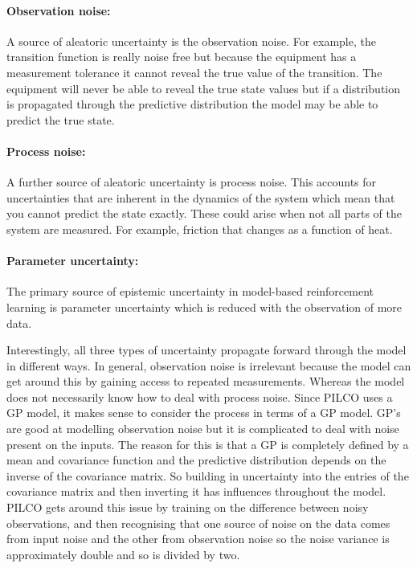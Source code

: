 \paragraph{Observation noise:} A source of aleatoric uncertainty is the observation noise. For example, the transition function is really noise free but because the equipment has a measurement tolerance it cannot reveal the true value of the transition. The equipment will never be able to reveal the true state values but if a distribution is propagated through the predictive distribution the model may be able to predict the true state. 

\paragraph{Process noise:} A further source of aleatoric uncertainty is process noise. This accounts for uncertainties that are inherent in the dynamics of the system which mean that you cannot predict the state exactly. These could arise when not all parts of the system are measured. For example, friction that changes as a function of heat.

\paragraph{Parameter uncertainty:} The primary source of epistemic uncertainty in model-based reinforcement learning is parameter uncertainty which is reduced with the observation of more data.

Interestingly, all three types of uncertainty propagate forward through the model in different ways. In general, observation noise is irrelevant because the model can get around this by gaining access to repeated measurements. Whereas the model does not necessarily know how to deal with process noise. Since PILCO uses a GP model, it makes sense to consider the process in terms of a GP model. GP's are good at modelling observation noise but it is complicated to deal with noise present on the inputs. The reason for this is that a GP is completely defined by a mean and covariance function and the predictive distribution depends on the inverse of the covariance matrix. So building in uncertainty into the entries of the covariance matrix and then inverting it has influences throughout the model. PILCO gets around this issue by training on the difference between noisy observations, and then recognising that one source of noise on the data comes from input noise and the other from observation noise so the noise variance is approximately double and so is divided by two.

